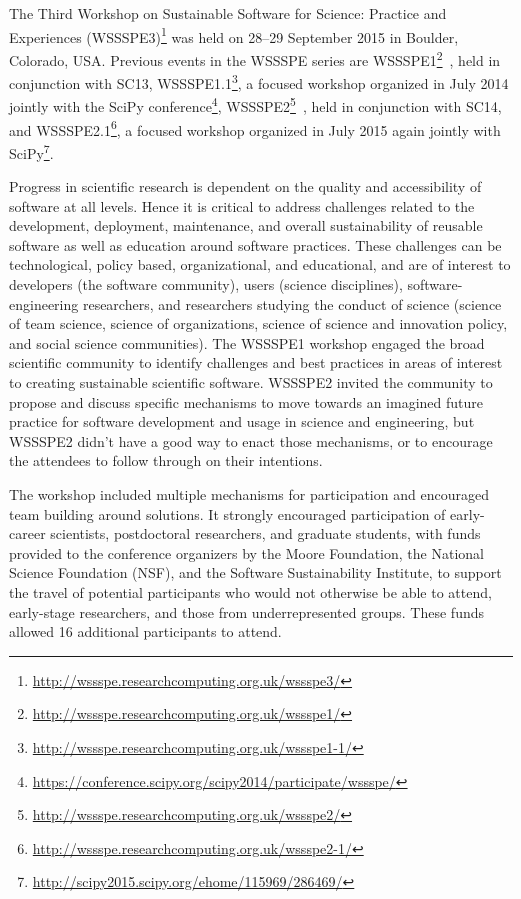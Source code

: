 \documentclass[11pt, oneside]{amsart}
\newcommand{\katznote}[1]{ {\textcolor{magenta}    { ***Dan:      #1 }}}
\newcommand{\gabnote}[1]{ {\textcolor{cyan}    { ***Gabrielle:     #1 }}}
\newcommand{\nchnote}[1]{  {\textcolor{orange}      { ***Neil: #1 }}}
\newcommand{\manishnote}[1]{  {\textcolor{violet}     { ***Manish: #1 }}}
\newcommand{\davidnote}[1]{  {\textcolor{darkgreen}      { ***David: #1 }}}
\begin{document}
%
%
%
%

The Third Workshop on Sustainable Software for Science: Practice and Experiences
(WSSSPE3)\footnote{\url{http://wssspe.researchcomputing.org.uk/wssspe3/}} was
held on 28--29 September 2015 in Boulder, Colorado, USA. Previous events in the
WSSSPE series are
WSSSPE1\footnote{\url{http://wssspe.researchcomputing.org.uk/wssspe1/}}~\cite{WSSSPE1-pre-report,WSSSPE1},
held in conjunction with SC13,
WSSSPE1.1\footnote{\url{http://wssspe.researchcomputing.org.uk/wssspe1-1/}}, a
focused workshop organized in July 2014 jointly with the SciPy
conference\footnote{\url{https://conference.scipy.org/scipy2014/participate/wssspe/}},
WSSSPE2\footnote{\url{http://wssspe.researchcomputing.org.uk/wssspe2/}}~\cite{WSSSPE2-pre-report,WSSSPE2},
held in conjunction with SC14, and
WSSSPE2.1\footnote{\url{http://wssspe.researchcomputing.org.uk/wssspe2-1/}}, a
focused workshop organized in July 2015 again jointly with
SciPy\footnote{\url{http://scipy2015.scipy.org/ehome/115969/286469/}}.

Progress in scientific research is dependent on the quality and accessibility of
software at all levels. Hence it is critical to address challenges related to
the development, deployment, maintenance, and overall sustainability of reusable
software as well as education around software practices. These challenges can be
technological, policy based, organizational, and educational, and are of
interest to developers (the software community), users (science disciplines),
software-engineering researchers, and researchers studying the conduct of
science (science of team science, science of organizations, science of science
and innovation policy, and social science communities). The WSSSPE1 workshop
engaged the broad scientific community to identify challenges and best practices
in areas of interest to creating sustainable scientific software. WSSSPE2
invited the community to propose and discuss specific mechanisms to move towards
an imagined future practice for software development and usage in science and
engineering, but WSSSPE2 didn't have a good way to enact those mechanisms, or to
encourage the attendees to follow through on their intentions.

The workshop included multiple mechanisms for participation and encouraged team
building around solutions. It strongly encouraged participation of early-career
scientists, postdoctoral researchers, and graduate students, with funds provided
to the conference organizers by the Moore Foundation, the National Science
Foundation (NSF), and the Software Sustainability Institute, to support the
travel of potential participants who would not otherwise be able to attend,
early-stage researchers, and those from underrepresented groups. These funds allowed
16 additional participants to attend.
\end{document}
